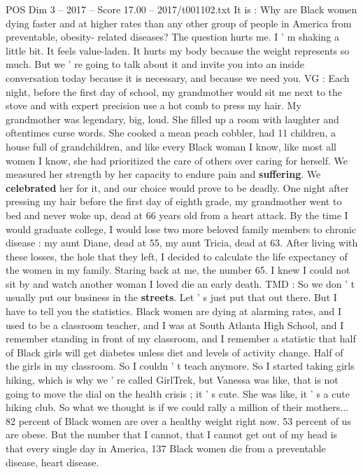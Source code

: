 \begin{textsample}{POS Dim 3 – 2017 – Score 17.00 – 2017/t001102.txt}
It is : Why are Black women dying faster and at higher rates than any other group of people in America from preventable, obesity- related diseases?
The question hurts me.
I ' m shaking a little bit.
It feels value-laden.
It hurts my body because the weight represents so much.
But we ' re going to talk about it and invite you into an inside conversation today because it is necessary, and because we need you.
VG : Each night, before the first day of school, my grandmother would sit me next to the stove and with expert precision use a hot comb to press my hair.
My grandmother was legendary, big, loud.
She filled up a room with laughter and oftentimes curse words.
She cooked a mean peach cobbler, had 11 children, a house full of grandchildren, and like every Black woman I know, like most all women I know, she had prioritized the care of others over caring for herself.
We measured her strength by her capacity to endure pain and \textbf{suffering}.
We \textbf{celebrated} her for it, and our choice would prove to be deadly.
One night after pressing my hair before the first day of eighth grade, my grandmother went to bed and never woke up, dead at 66 years old from a heart attack.
By the time I would graduate college, I would lose two more beloved family members to chronic disease : my aunt Diane, dead at 55, my aunt Tricia, dead at 63.
After living with these losses, the hole that they left, I decided to calculate the life expectancy of the women in my family.
Staring back at me, the number 65.
I knew I could not sit by and watch another woman I loved die an early death.
TMD : So we don ' t usually put our business in the \textbf{streets}.
Let ' s just put that out there.
But I have to tell you the statistics.
Black women are dying at alarming rates, and I used to be a classroom teacher, and I was at South Atlanta High School, and I remember standing in front of my classroom, and I remember a statistic that half of Black girls will get diabetes unless diet and levels of activity change.
Half of the girls in my classroom.
So I couldn ' t teach anymore.
So I started taking girls hiking, which is why we ' re called GirlTrek, but Vanessa was like, that is not going to move the dial on the health crisis ; it ' s cute.
She was like, it ' s a cute hiking club.
So what we thought is if we could rally a million of their mothers... 82 percent of Black women are over a healthy weight right now. 53 percent of us are obese.
But the number that I cannot, that I cannot get out of my head is that every single day in America, 137 Black women die from a preventable disease, heart disease.

\end{textsample}
